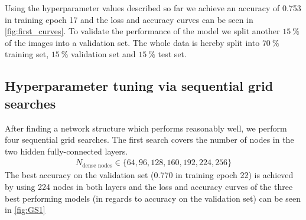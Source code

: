 Using the hyperparameter values described so far we achieve an accuracy of 0.753 in training epoch 17 and the loss and accuracy curves can be seen in \autoref{fig:first_curves}. 
To validate the performance of the model we split another $\SI{15}{\percent}$ of the images into a validation set.
The whole data is hereby split into $\SI{70}{\percent}$ training set, $\SI{15}{\percent}$ validation set and $\SI{15}{\percent}$ test set.


\subsection{Hyperparameter tuning via sequential grid searches}
After finding a network structure which performs reasonably well, we perform four sequential grid searches.
The first search covers the number of nodes in the two hidden fully-connected layers.
\begin{align}
    N_\text{dense nodes} \in \{64, 96, 128, 160, 192, 224, 256\}
\end{align}
The best accuracy on the validation set (0.770 in training epoch 22) is achieved by using 224 nodes in both layers and the loss and accuracy curves of the three best performing models 
(in regards to accuracy on the validation set) can be seen in \autoref{fig:GS1}

